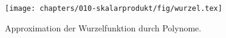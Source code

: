 %
%
%
\begin{figure}
\centering
\texttt{[image: chapters/010-skalarprodukt/fig/wurzel.tex]}
\caption{Approximation der Wurzelfunktion durch Polynome.
\label{buch:skalarprodukt:funktionenraeume:fig:wurzel}}
\end{figure}

